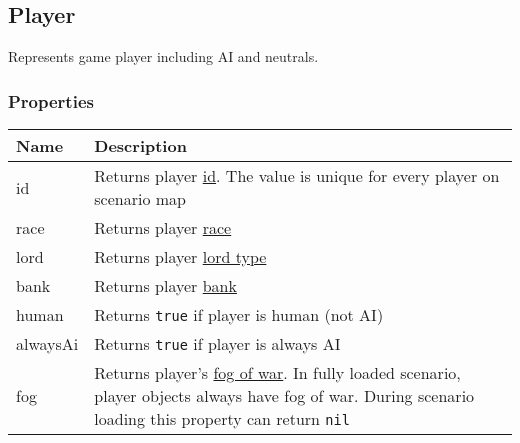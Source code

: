 \subsection{Player}
\label{Player}
Represents game player including AI and neutrals.
\subsubsection{Properties}
\begin{center}
\begin{tabularx}{\linewidth}{| l | X |}
\hline
\textbf{Name} & \textbf{Description} \\
\hline
id & Returns player \hyperref[Id]{id}. The value is unique for every player on scenario map\\
\hline
race & Returns player \hyperref[RaceCategory]{race}\\
\hline
lord & Returns player \hyperref[LordCategory]{lord type}\\
\hline
bank & Returns player \hyperref[Currency]{bank}\\
\hline
human & Returns \texttt{true} if player is human (not AI)\\
\hline
alwaysAi & Returns \texttt{true} if player is always AI\\
\hline
fog & Returns player's \hyperref[Fog]{fog of war}. In fully loaded scenario, player objects always have fog of war. During scenario loading this property can return \texttt{nil}\\
\hline
\end{tabularx}
\end{center}